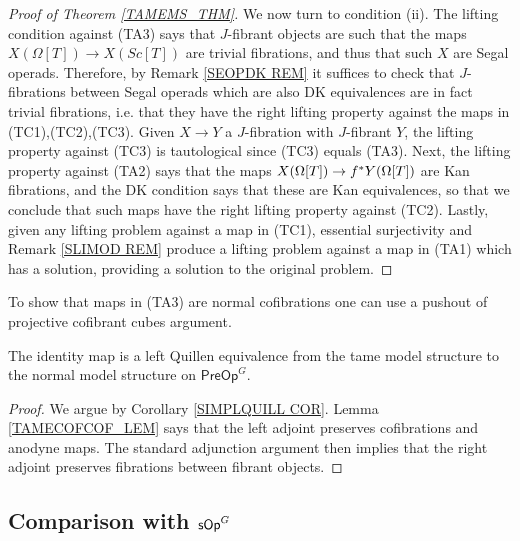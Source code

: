 \documentclass[a4paper,10pt
,draft
]{article}%
\renewcommand{\1}{\eta}%
\begin{document}
\begin{proof}[Proof of Theorem \ref{TAMEMS_THM}]
We now turn to condition (ii).
The lifting condition against (TA3) says that $J$-fibrant objects are such that the maps $X(\Omega[T]) \to X(Sc[T])$
are trivial fibrations, and thus that such $X$ are Segal operads.
Therefore, by Remark \ref{SEOPDK REM} it suffices to check that $J$-fibrations between Segal operads which are also DK equivalences are in fact trivial fibrations, i.e. that they have the right lifting property against the maps in (TC1),(TC2),(TC3).
Given $X \to Y$ a $J$-fibration with $J$-fibrant $Y$,
the lifting property against (TC3) is tautological since 
(TC3) equals (TA3).
Next, the lifting property against (TA2) says that the maps
$X(\Omega[T]) \to f^{\**} Y(\Omega[T])$
are Kan fibrations, and the DK condition says that these are Kan equivalences,
so that we conclude that such maps have the right lifting property against (TC2).
Lastly, given any lifting problem against a map in (TC1),
essential surjectivity and Remark \ref{SLIMOD REM}
produce a lifting problem against a map in (TA1) which has a solution, providing a solution to the original problem.
\end{proof}


{\color{red} To show that maps in (TA3) are normal cofibrations one can use a pushout of projective cofibrant cubes argument.}


\begin{theorem}
      The identity map is a left Quillen equivalence from the tame model structure to the normal model structure on $\mathsf{PreOp}^G$.
\end{theorem}
\begin{proof}
      We argue by Corollary \ref{SIMPLQUILL COR}.
      Lemma \ref{TAMECOFCOF_LEM} says that the left adjoint preserves cofibrations and anodyne maps.
      The standard adjunction argument then implies that the right adjoint preserves fibrations between fibrant objects.
\end{proof}


\subsection{Comparison with $\mathsf{sOp}^G$}
\end{document}

